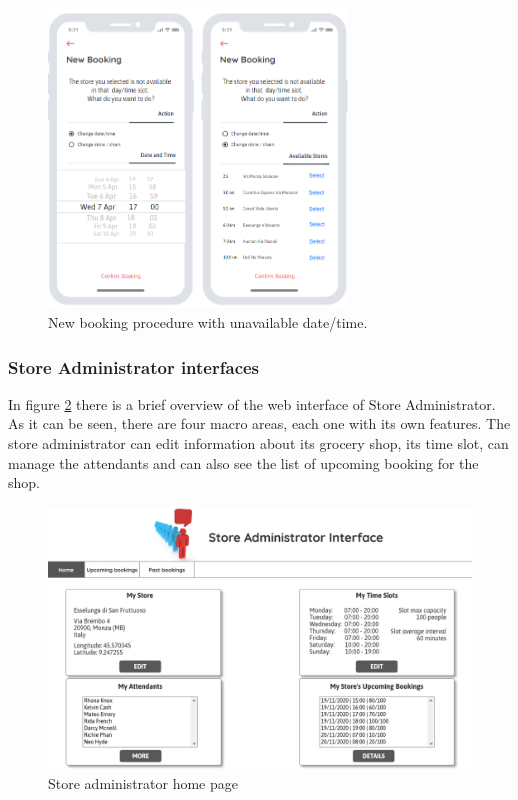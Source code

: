 \documentclass[table, 12pt]{article}
\begin{document}
\begin{figure}[H]
    \begin{center}
        \includegraphics[width=225pt]{assets/mock_new_booking_unavailable.png}
        \caption{New booking procedure with unavailable date/time.}
        \label{mock_new_booking_unavailable}
    \end{center}
\end{figure}

\subsubsection{Store Administrator interfaces}
In figure \ref{mock_store_admin_home} there is a brief overview of the web interface of Store Administrator.
As it can be seen, there are four macro areas, each one with its own features.
The store administrator can edit information about its grocery shop, its time slot, can manage the attendants and can also see the list of upcoming booking for the shop.
\begin{figure}[H]
    \includegraphics[width=\textwidth]{assets/mock_home_store_admin.png}
    \caption{Store administrator home page}
    \label{mock_store_admin_home}
\end{figure}
\end{document}
